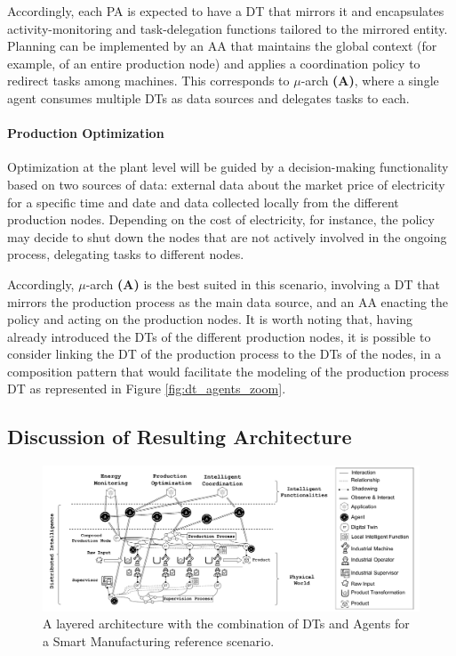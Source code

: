 Accordingly, each PA is expected to have a DT that mirrors it and encapsulates activity-monitoring and task-delegation functions tailored to the mirrored entity.
Planning can be implemented by an AA that maintains the global context (for example, of an entire production node) and applies a coordination policy to redirect tasks among machines.
This corresponds to $\mu$-arch \textbf{(A)}, where a single agent consumes multiple DTs as data sources and delegates tasks to each.

\paragraph{Production Optimization}

Optimization at the plant level will be guided by a decision-making functionality based on two sources of data: external data about the market price of electricity for a specific time and date
and data collected locally from the different production nodes. 
%
Depending on the cost of electricity, for instance, the policy may decide to shut down the nodes that are not actively involved in the ongoing process, delegating tasks to different nodes.

Accordingly, $\mu$-arch \textbf{(A)} is the best suited in this scenario, involving a DT that mirrors the production process as the main data source, and an AA enacting the policy and acting on the production nodes.
%
It is worth noting that, having already introduced the DTs of the different production nodes, it is possible to consider linking the DT of the production process to the DTs of the nodes, in a composition pattern that would facilitate the modeling of the production process DT as represented in Figure \ref{fig:dt_agents_zoom}.

\subsection{Discussion of Resulting Architecture}

\begin{figure}
    \centering
    \includegraphics[width=\columnwidth]{figures/dt-mas/dt_agents_smart_manufacturing.pdf}
    \caption{A layered architecture with the combination of DTs and Agents for a Smart Manufacturing reference scenario.}
    \label{fig:dt_agents_smart_manufacturing}
\end{figure}

